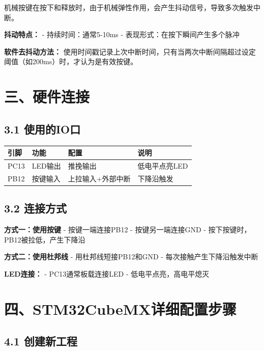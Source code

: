 \documentclass[
  chinese,
  UTF8,
  oneside,
  openany]{ctexbook}
\begin{document}
机械按键在按下和释放时，由于机械弹性作用，会产生抖动信号，导致多次触发中断。

\textbf{抖动特点：} - 持续时间：通常5-10ms -
表现形式：在按下瞬间产生多个脉冲

\textbf{软件去抖动方法：}
使用时间戳记录上次中断时间，只有当两次中断间隔超过设定阈值（如200ms）时，才认为是有效按键。

\section{三、硬件连接}\label{ux4e09ux786cux4ef6ux8fdeux63a5}

\subsection{3.1 使用的IO口}\label{ux4f7fux7528ux7684ioux53e3}

\begin{longtable}[]{@{}llll@{}}
\toprule\noalign{}
引脚 & 功能 & 配置 & 说明 \\
\midrule\noalign{}
\endhead
\bottomrule\noalign{}
\endlastfoot
PC13 & LED输出 & 推挽输出 & 低电平点亮LED \\
PB12 & 按键输入 & 上拉输入+外部中断 & 下降沿触发 \\
\end{longtable}

\subsection{3.2 连接方式}\label{ux8fdeux63a5ux65b9ux5f0f}

\textbf{方式一：使用按键} - 按键一端连接PB12 - 按键另一端连接GND -
按下按键时，PB12被拉低，产生下降沿

\textbf{方式二：使用杜邦线} - 用杜邦线短接PB12和GND -
每次接触产生下降沿触发中断

\textbf{LED连接：} - PC13通常板载连接LED - 低电平点亮，高电平熄灭

\section{四、STM32CubeMX详细配置步骤}\label{ux56dbstm32cubemxux8be6ux7ec6ux914dux7f6eux6b65ux9aa4}

\subsection{4.1 创建新工程}\label{ux521bux5efaux65b0ux5de5ux7a0b}
\end{document}
